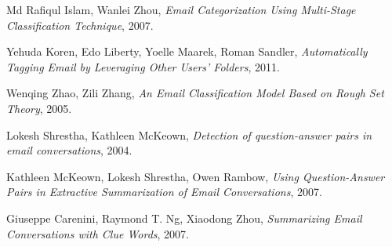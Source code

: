 \documentclass[12pt]{article}
\begin{document}
\begin{thebibliography}{99}
  Md Rafiqul Islam,
  Wanlei Zhou,
  \emph{Email Categorization Using Multi-Stage Classification Technique},
  2007.

  Yehuda Koren,
  Edo Liberty,
  Yoelle Maarek,
  Roman Sandler,
  \emph{Automatically Tagging Email by Leveraging Other Users' Folders},
  2011.

  Wenqing Zhao,
  Zili Zhang,
  \emph{An Email Classification Model Based on Rough Set Theory},
  2005.

  Lokesh Shrestha,
  Kathleen McKeown,
  \emph{Detection of question-answer pairs in email conversations},
  2004.

  Kathleen McKeown,
  Lokesh Shrestha,
  Owen Rambow,
  \emph{Using Question-Answer Pairs in Extractive Summarization of Email Conversations},
  2007.

  Giuseppe Carenini,
  Raymond T. Ng,
  Xiaodong Zhou,
  \emph{Summarizing Email Conversations with Clue Words},
  2007.
\end{thebibliography}
\end{document}
